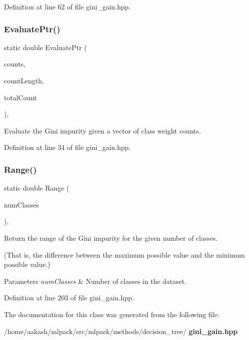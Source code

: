 Definition at line 62 of file gini\+\_\+gain.\+hpp.

\mbox{\label{classmlpack_1_1tree_1_1GiniGain_a67d1277fdaf085606937d4b523f615ba}} 
\subsubsection{Evaluate\+Ptr()}
{\footnotesize\ttfamily static double Evaluate\+Ptr (\begin{DoxyParamCaption}\item[{const Count\+Type $\ast$}]{counts,  }\item[{const size\+\_\+t}]{count\+Length,  }\item[{const Count\+Type}]{total\+Count }\end{DoxyParamCaption})\hspace{0.3cm}{\ttfamily [inline]}, {\ttfamily [static]}}



Evaluate the Gini impurity given a vector of class weight counts. 



Definition at line 34 of file gini\+\_\+gain.\+hpp.

\mbox{\label{classmlpack_1_1tree_1_1GiniGain_a9d801bb1be5db5207213f846f224458f}} 
\subsubsection{Range()}
{\footnotesize\ttfamily static double Range (\begin{DoxyParamCaption}\item[{const size\+\_\+t}]{num\+Classes }\end{DoxyParamCaption})\hspace{0.3cm}{\ttfamily [inline]}, {\ttfamily [static]}}



Return the range of the Gini impurity for the given number of classes. 

(That is, the difference between the maximum possible value and the minimum possible value.)


\begin{DoxyParams}{Parameters}
{\em num\+Classes} & Number of classes in the dataset. \\
\hline
\end{DoxyParams}


Definition at line 203 of file gini\+\_\+gain.\+hpp.



The documentation for this class was generated from the following file\+:\begin{DoxyCompactItemize}
\item 
/home/aakash/mlpack/src/mlpack/methods/decision\+\_\+tree/\textbf{ gini\+\_\+gain.\+hpp}\end{DoxyCompactItemize}
